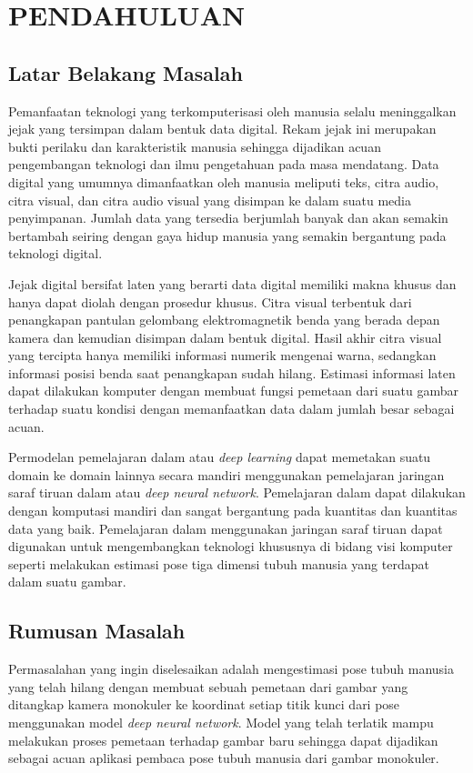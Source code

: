 
\chapter{PENDAHULUAN}
\label{cha:1-Pendahuluan}

\section{Latar Belakang Masalah}
\label{sec:1-LatarBelakangMasalah}

Pemanfaatan teknologi yang terkomputerisasi oleh manusia selalu meninggalkan jejak yang
tersimpan dalam bentuk data digital. Rekam jejak ini merupakan bukti perilaku dan karakteristik
manusia  sehingga dijadikan acuan pengembangan teknologi dan ilmu pengetahuan pada masa mendatang.
Data digital yang umumnya dimanfaatkan oleh manusia meliputi teks, citra audio, citra visual, dan
citra audio visual yang disimpan ke dalam suatu media penyimpanan. Jumlah data yang tersedia
berjumlah banyak dan akan semakin bertambah seiring dengan gaya hidup manusia yang semakin
bergantung pada teknologi digital.

Jejak digital bersifat laten yang berarti data digital memiliki makna khusus dan hanya dapat diolah
dengan prosedur khusus. Citra visual terbentuk dari penangkapan pantulan gelombang elektromagnetik
benda yang berada depan kamera dan kemudian disimpan dalam bentuk digital. Hasil akhir citra visual
yang tercipta hanya memiliki informasi numerik mengenai warna, sedangkan
informasi posisi benda saat penangkapan sudah hilang. Estimasi informasi laten dapat
dilakukan komputer dengan membuat fungsi pemetaan dari suatu gambar terhadap suatu kondisi dengan
memanfaatkan data dalam jumlah besar sebagai acuan.

Permodelan pemelajaran dalam atau \textit{deep learning} dapat memetakan suatu domain ke
domain lainnya secara mandiri menggunakan pemelajaran jaringan saraf tiruan dalam atau
\textit{deep neural network}. Pemelajaran dalam dapat dilakukan dengan komputasi mandiri dan
sangat bergantung pada kuantitas dan kuantitas data yang baik.
Pemelajaran dalam menggunakan jaringan
saraf tiruan dapat digunakan untuk mengembangkan teknologi khususnya di bidang visi komputer
seperti melakukan estimasi pose tiga dimensi tubuh manusia yang terdapat dalam suatu gambar.

\section{Rumusan Masalah}
\label{sec:1-RumusanMasalah}
Permasalahan yang ingin diselesaikan adalah mengestimasi pose tubuh manusia yang
telah hilang dengan membuat sebuah pemetaan dari gambar yang ditangkap kamera monokuler ke
koordinat setiap titik kunci dari pose menggunakan model \textit{deep neural network}.
Model yang telah terlatik mampu melakukan proses
pemetaan terhadap gambar baru sehingga dapat dijadikan sebagai acuan aplikasi pembaca pose tubuh
manusia dari gambar monokuler.

